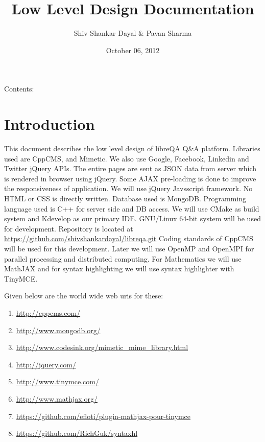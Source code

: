 \documentclass[letterpaper,10pt,english]{sphinxmanual}
\title{Low Level Design Documentation}
\date{October 06, 2012}
\author{Shiv Shankar Dayal \& Pavan Sharma}
\begin{document}
\maketitle
\tableofcontents
{}\label{index::doc}


Contents:


\chapter{Introduction}
\label{intro:introduction}\label{intro::doc}\label{intro:welcome-to-low-level-design-s-documentation}
This document describes the low level design of libreQA Q\&A platform. Libraries
used are CppCMS, and Mimetic. We also use Google, Facebook, Linkedin and Twitter
jQuery APIs. The entire pages are sent as JSON data from server which is rendered
in browser using jQuery. Some AJAX pre-loading is done to improve the
responsiveness of application. We will use jQuery Javsscript framework. No HTML or
CSS is directly written. Database used is MongoDB. Programming language used is
C++ for server side and DB access. We will use CMake as build system and Kdevelop
as our primary IDE. GNU/Linux 64-bit system will be used for development.
Repository is located at \href{https://github.com/shivshankardayal/libreqa.git}{https://github.com/shivshankardayal/libreqa.git}
Coding standards of CppCMS will be used for this development. Later we will use
OpenMP and OpenMPI for parallel processing and distributed computing.
For Mathematics we will use MathJAX and for syntax highlighting we will use
syntax highlighter with TinyMCE.

Given below are the world wide web uris for these:
\begin{enumerate}
\item {} 
\href{http://cppcms.com/}{http://cppcms.com/}

\item {} 
\href{http://www.mongodb.org/}{http://www.mongodb.org/}

\item {} 
\href{http://www.codesink.org/mimetic\_mime\_library.html}{http://www.codesink.org/mimetic\_mime\_library.html}

\item {} 
\href{http://jquery.com/}{http://jquery.com/}

\item {} 
\href{http://www.tinymce.com/}{http://www.tinymce.com/}

\item {} 
\href{http://www.mathjax.org/}{http://www.mathjax.org/}

\item {} 
\href{https://github.com/efloti/plugin-mathjax-pour-tinymce}{https://github.com/efloti/plugin-mathjax-pour-tinymce}

\item {} 
\href{https://github.com/RichGuk/syntaxhl}{https://github.com/RichGuk/syntaxhl}

\end{enumerate}
\end{document}
